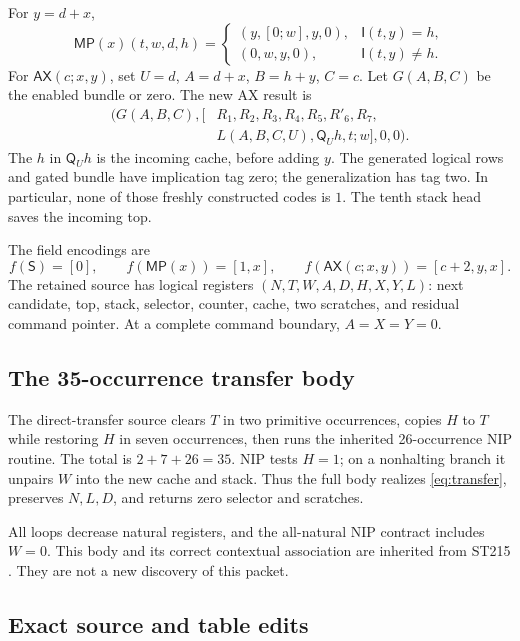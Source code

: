 \documentclass[11pt,a4paper]{article}
\theoremstyle{definition}
\newcommand{\imp}{\mathsf I}
\newcommand{\qnt}{\mathsf Q}
\newcommand{\AX}{\mathsf{AX}}
\newcommand{\MP}{\mathsf{MP}}
\newcommand{\Tr}{\mathsf S}
\numberwithin{equation}{section}
\begin{document}
For $y=d+x$,
\begin{equation}
 \MP(x)(t,w,d,h)=
 \begin{cases}
 (y,[0;w],y,0),&\imp(t,y)=h,\\
 (0,w,y,0),&\imp(t,y)\ne h.
 \end{cases}
 \label{eq:mp}
\end{equation}
For $\AX(c;x,y)$, set $U=d$, $A=d+x$, $B=h+y$, $C=c$.
Let $G(A,B,C)$ be the enabled bundle or zero. The new AX result is
\begin{equation}
 \begin{split}
 \bigl(G(A,B,C),[&R_1,R_2,R_3,R_4,R_5,R'_6,R_7,\\
                 &L(A,B,C,U),\qnt_U h,t;w],0,0\bigr).
 \end{split}
 \label{eq:ax}
\end{equation}
The $h$ in $\qnt_U h$ is the incoming cache, before adding $y$.
The generated logical rows and gated bundle have implication tag zero;
the generalization has tag two. In particular, none of those freshly
constructed codes is $1$. The tenth stack head saves the incoming top.

The field encodings are
\[
 f(\Tr)=[0],\qquad f(\MP(x))=[1,x],\qquad
 f(\AX(c;x,y))=[c+2,y,x].
\]
The retained source has logical registers
$(N,T,W,A,D,H,X,Y,L)$: next candidate, top, stack, selector, counter,
cache, two scratches, and residual command pointer. At a complete
command boundary, $A=X=Y=0$.

\subsection{The 35-occurrence transfer body}

The direct-transfer source clears $T$ in two primitive occurrences,
copies $H$ to $T$ while restoring $H$ in seven occurrences, then runs
the inherited 26-occurrence NIP routine. The total is $2+7+26=35$.
NIP tests $H=1$; on a nonhalting branch it unpairs $W$ into the new
cache and stack. Thus the full body realizes \eqref{eq:transfer},
preserves $N,L,D$, and returns zero selector and scratches.

All loops decrease natural registers, and the all-natural NIP contract
includes $W=0$. This body and its correct contextual association are
inherited from ST215 \cite{direct}. They are not a new discovery of this
packet.

\subsection{Exact source and table edits}
\end{document}
